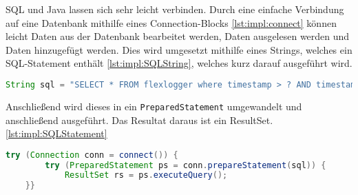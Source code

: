 SQL und Java lassen sich sehr leicht verbinden. Durch eine einfache Verbindung auf eine Datenbank mithilfe eines Connection-Blocks \ref{lst:impl:connect} können leicht Daten aus der Datenbank bearbeitet werden, Daten ausgelesen werden und Daten hinzugefügt werden. Dies wird umgesetzt mithilfe eines Strings, welches ein SQL-Statement enthält \ref{lst:impl:SQLString}, welches kurz darauf ausgeführt wird. 

\begin{lstlisting}[language=java,caption=SQL-String,label=lst:impl:SQLString]
    String sql = "SELECT * FROM flexlogger where timestamp > ? AND timestamp < ? order by timestamp";
\end{lstlisting}

Anschließend wird dieses in ein \texttt{PreparedStatement} umgewandelt und anschließend ausgeführt. Das Resultat daraus ist ein ResultSet. \ref{lst:impl:SQLStatement}

\begin{lstlisting}[language=java,caption=SQL-Statement ausführen,label=lst:impl:SQLStatement]
    try (Connection conn = connect()) {
        try (PreparedStatement ps = conn.prepareStatement(sql)) {
            ResultSet rs = ps.executeQuery();
    }}
\end{lstlisting}
